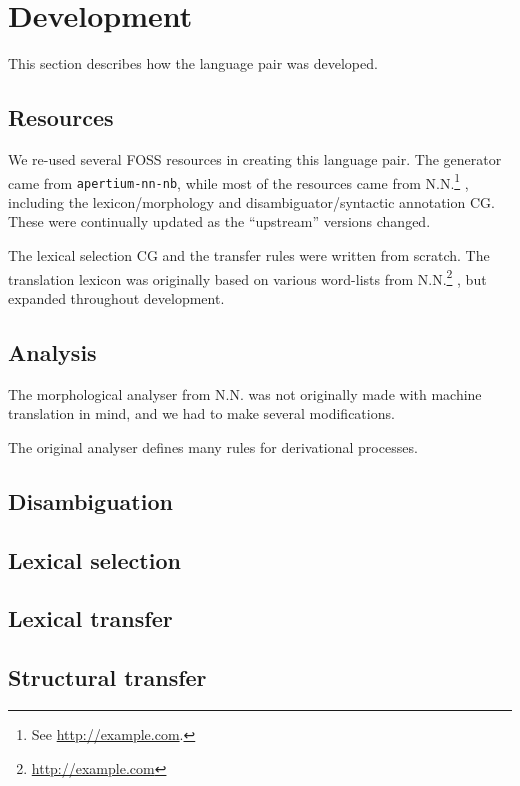 \section{Development}
  \label{sec:development}

This section describes how the language pair was developed.
\subsection{Resources}
We re-used several FOSS resources in creating this language pair. The
\nob{} generator came from {\tt apertium-nn-nb}\citep{unhammer2009rfr},
while most of the \sme{} resources came from N.N.\footnote{See
 \href{http://example.com}{http://example.com}.} , including the
lexicon/morphology and disambiguator/syntactic annotation CG. These
were continually updated as the ``upstream'' versions changed.

The lexical selection CG and the transfer rules were written from
scratch. The translation lexicon was originally based on various
word-lists from
N.N.\footnote{\href{http://example.com}{http://example.com}}
, but expanded throughout
development.
\subsection{Analysis}
The morphological analyser from N.N. was not
originally made with machine translation in mind, and we had to make
several modifications.

The original analyser defines many rules for derivational processes.

\subsection{Disambiguation}
\subsection{Lexical selection}


\subsection{Lexical transfer}

\subsection{Structural transfer}
\label{sec:structural-transfer}

